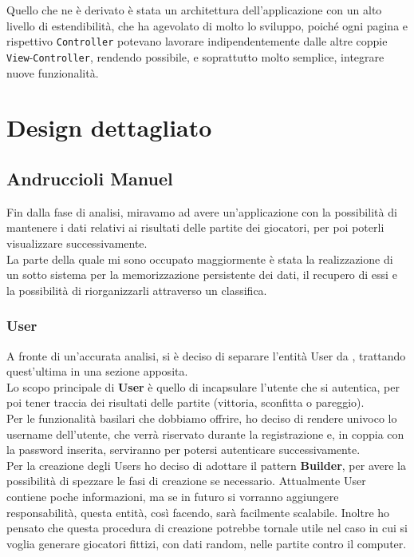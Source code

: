\documentclass[a4paper,12pt]{report}
\begin{document}
\paragraph{}
\
\\
Quello che ne è derivato è stata un architettura dell'applicazione con un alto livello di estendibilità, che ha agevolato di molto lo sviluppo, poiché ogni pagina e rispettivo \texttt{Controller} potevano lavorare indipendentemente dalle altre coppie \texttt{View}-\texttt{Controller}, rendendo possibile, e soprattutto molto semplice, integrare nuove funzionalità.

\clearpage
\section{Design dettagliato}

\subsection{Andruccioli Manuel}

Fin dalla fase di analisi, miravamo ad avere un'applicazione con la possibilità di mantenere i dati relativi ai risultati delle partite dei giocatori, per poi poterli visualizzare successivamente.
\\
La parte della quale mi sono occupato maggiormente è stata la realizzazione di un sotto sistema per la memorizzazione persistente dei dati, il recupero di essi e la possibilità di riorganizzarli attraverso un classifica.

\subsubsection*{User}
\label{User}

A fronte di un'accurata analisi, si è deciso di separare l'entità User da \texttt{}, trattando quest'ultima in una sezione apposita.
\\
Lo scopo principale di \textbf{User} è quello di incapsulare l'utente che si autentica, per poi tener traccia dei risultati delle partite (vittoria, sconfitta o pareggio).
\\
Per le funzionalità basilari che dobbiamo offrire, ho deciso di rendere univoco lo username dell'utente, che verrà riservato durante la registrazione e, in coppia con la password inserita, serviranno per potersi autenticare successivamente.
\\
Per la creazione degli Users ho deciso di adottare il pattern \textbf{Builder}, per avere la possibilità di spezzare le fasi di creazione se necessario. Attualmente User contiene poche informazioni, ma se in futuro si vorranno aggiungere responsabilità, questa entità, così facendo, sarà facilmente scalabile. Inoltre ho pensato che questa procedura di creazione potrebbe tornale utile nel caso in cui si voglia generare giocatori fittizi, con dati random, nelle partite contro il computer.
\end{document}
